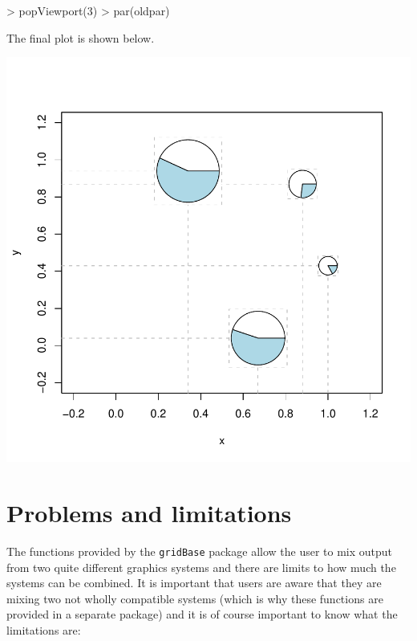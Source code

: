 \documentclass[a4paper]{article}
\newcommand{\gridBase}{{\tt gridBase}}
\begin{document}
\begin{Schunk}
\begin{Sinput}
> popViewport(3)
> par(oldpar)
\end{Sinput}
\end{Schunk}
The final plot is shown below.

\includegraphics{gridBase-complex}
\section*{Problems and limitations}

The functions provided by the \gridBase{} package allow the user
to mix output from two quite different graphics systems and there 
are limits to how much the systems can be combined.  It is important
that users are aware that they are mixing two not wholly compatible
systems (which is why these functions are provided in a separate 
package) and it is of course important to know what the limitations
are: 
\end{document}
